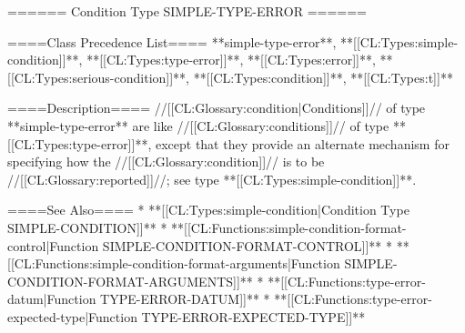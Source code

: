 ====== Condition Type SIMPLE-TYPE-ERROR ======

====Class Precedence List====
**simple-type-error**, **[[CL:Types:simple-condition]]**, **[[CL:Types:type-error]]**, **[[CL:Types:error]]**, **[[CL:Types:serious-condition]]**, **[[CL:Types:condition]]**, **[[CL:Types:t]]**

====Description====
//[[CL:Glossary:condition|Conditions]]// of type **simple-type-error** are like //[[CL:Glossary:conditions]]// of type **[[CL:Types:type-error]]**, except that they provide an alternate mechanism for specifying how the //[[CL:Glossary:condition]]// is to be //[[CL:Glossary:reported]]//; see type **[[CL:Types:simple-condition]]**.

====See Also====
  * **[[CL:Types:simple-condition|Condition Type SIMPLE-CONDITION]]**
  * **[[CL:Functions:simple-condition-format-control|Function SIMPLE-CONDITION-FORMAT-CONTROL]]**
  * **[[CL:Functions:simple-condition-format-arguments|Function SIMPLE-CONDITION-FORMAT-ARGUMENTS]]**
  * **[[CL:Functions:type-error-datum|Function TYPE-ERROR-DATUM]]**
  * **[[CL:Functions:type-error-expected-type|Function TYPE-ERROR-EXPECTED-TYPE]]**

 
